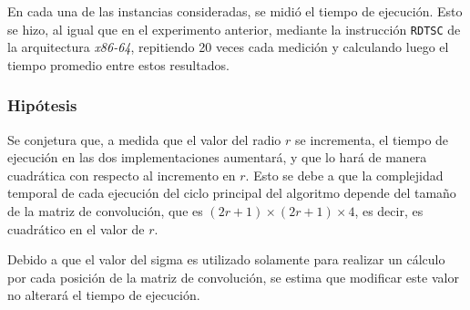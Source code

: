             En cada una de las instancias consideradas, se midió el tiempo de ejecución. Esto se hizo, al igual que en el experimento anterior, mediante la instrucción \texttt{RDTSC} de la arquitectura \emph{x86-64}, repitiendo 20 veces cada medición y calculando luego el tiempo promedio entre estos resultados.
            
        \subsubsection*{Hipótesis}
             Se conjetura que, a medida que el valor del radio $r$ se incrementa, el tiempo de ejecución en las dos implementaciones aumentará, y que lo hará de manera cuadrática con respecto al incremento en $r$. Esto se debe a que la complejidad temporal de cada ejecución del ciclo principal del algoritmo depende del tamaño de la matriz de convolución, que es $(2r + 1) \times (2r + 1) \times 4$, es decir, es cuadrático en el valor de $r$.

             Debido a que el valor del sigma es utilizado solamente para realizar un cálculo por cada posición de la matriz de convolución, se estima que modificar este valor no alterará el tiempo de ejecución.


